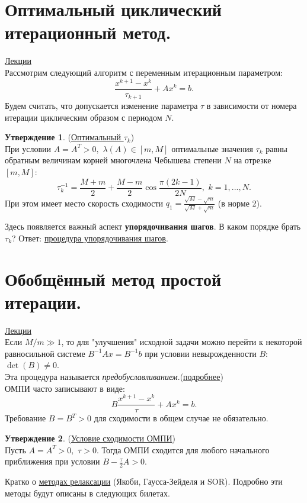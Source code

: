 \documentclass[specialist, subf, href, colorlinks=true, 12pt, times, mtpro, final]{disser}
\theoremstyle{definition}
\newtheorem{state}{Утверждение}[section]
\begin{document}
\section {Оптимальный циклический итерационный метод.}
	\hyperlink {lects.61}{Лекции}\\
	Рассмотрим следующий алгоритм с переменным итерационным параметром:
	$$
	    \frac{x^{k+1} - x^{k}}{\tau_{k+1}} + Ax^{k} = b.
	$$
	Будем считать, что допускается изменение параметра $\tau$ в зависимости от номера итерации циклическим образом с периодом $N$.
	\begin{state} (\hyperlink {lects.61}{Оптимальный $\tau_{k}$})\\
	При условии $A = A^T > 0, \,\, \lambda(A) \in [m, M]$ оптимальные значения $\tau_k$
	равны обратным величинам корней многочлена Чебышева степени $N$ на отрезке $[m, M]$:
	$$
	\tau_k^{-1} = \frac{M+m}{2} + \frac{M-m}{2}\cos\frac{\pi(2k-1)}{2N}, \,\, k = 1,...,N.
	$$
	При этом имеет место скорость сходимости
	$q_1 = \frac{\sqrt{M}-\sqrt{m}}{\sqrt{M}+\sqrt{m}}$ (в норме 2).
	\end{state}
	Здесь появляется важный аспект {\bf упорядочивания шагов}. В каком порядке брать $\tau_k$?
	Ответ: \hyperlink {lects.62}{процедура упорядочивания шагов}.

\section {Обобщённый метод простой итерации.}
	\hyperlink {lects.63}{Лекции}\\
	Если $M/m \gg 1$, то для "улучшения"{} исходной задачи можно перейти к некоторой равносильной системе $B^{-1}Ax = B^{-1}b$ при условии невырожденности $B$:
	$\det(B) \ne 0$.\\
	Эта процедура называется {\it предобуславливанием}.(\hyperlink {lects.63}{подробнее})\\
	ОМПИ часто записывают в виде:
	$$
	    B\frac{x^{k+1} - x^{k}}{\tau} + Ax^{k} = b.
	$$
	Требование $B = B^T > 0$ для сходимости в общем случае не обязательно.
	\begin{state} (\hyperlink {lects.63}{Условие сходимости ОМПИ})\\
	Пусть $A = A^T > 0, \,\, \tau > 0$. Тогда ОМПИ сходится для любого начального
	приближения при условии $B - \frac{\tau}{2}A > 0$.
	\end{state}
	Кратко о \hyperlink {lects.64}{методах релаксации} (Якоби, Гаусса-Зейделя и SOR).
	Подробно эти методы будут описаны в следующих билетах.
\end{document}

